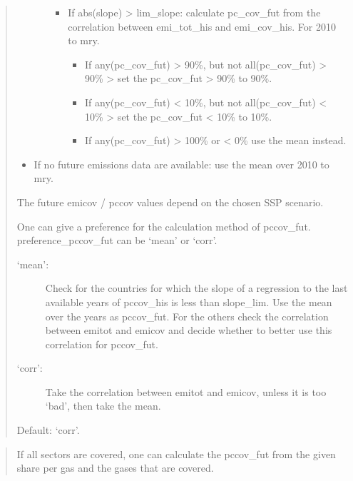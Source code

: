 \documentclass[letterpaper,10pt,english]{sphinxmanual}
\begin{document}
\begin{quote}
\begin{itemize}
\begin{itemize}
\begin{itemize}
\item {} 
If abs(slope) \textgreater{} lim\_slope: calculate pc\_cov\_fut from the correlation between emi\_tot\_his and emi\_cov\_his. For 2010 to mry.
\begin{itemize}
\item {} 
If any(pc\_cov\_fut) \textgreater{} 90\%, but not all(pc\_cov\_fut) \textgreater{} 90\% \textendash{}\textgreater{} set the pc\_cov\_fut \textgreater{} 90\% to 90\%.

\item {} 
If any(pc\_cov\_fut) \textless{} 10\%, but not all(pc\_cov\_fut) \textless{} 10\% \textendash{}\textgreater{} set the pc\_cov\_fut \textless{} 10\% to 10\%.

\item {} 
If any(pc\_cov\_fut) \textgreater{} 100\% or \textless{} 0\% use the mean instead.

\end{itemize}

\end{itemize}

\end{itemize}

\item {} 
If no future emissions data are available: use the mean over 2010 to mry.

\end{itemize}

The future emicov / pccov values depend on the chosen SSP scenario.

One can give a preference for the calculation method of pccov\_fut.
preference\_pccov\_fut can be ‘mean’ or ‘corr’.
\begin{description}
\item[{‘mean’:}] \leavevmode
Check for the countries for which the slope of a regression to the last available years of pccov\_his is less than slope\_lim.
Use the mean over the years as pccov\_fut.
For the others check the correlation between emitot and emicov and decide whether to better use this correlation for pccov\_fut.

\item[{‘corr’:}] \leavevmode
Take the correlation between emitot and emicov, unless it is too ‘bad’, then take the mean.

\end{description}

Default: ‘corr’.
\end{quote}

\begin{quote}

If all sectors are covered, one can calculate the pccov\_fut from the given share per gas
and the gases that are covered.
\end{quote}
\end{document}
